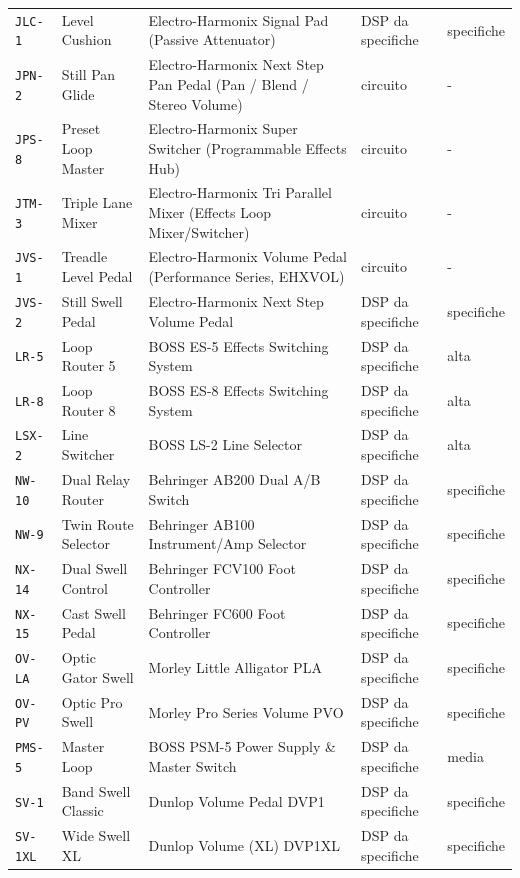\begin{xltabular}{\linewidth}{@{}l l X l l@{}}
\texttt{JLC-1} & Level Cushion & Electro-Harmonix Signal Pad (Passive Attenuator) & DSP da specifiche & specifiche\\
\texttt{JPN-2} & Still Pan Glide & Electro-Harmonix Next Step Pan Pedal (Pan / Blend / Stereo Volume) & circuito & -\\
\texttt{JPS-8} & Preset Loop Master & Electro-Harmonix Super Switcher (Programmable Effects Hub) & circuito & -\\
\texttt{JTM-3} & Triple Lane Mixer & Electro-Harmonix Tri Parallel Mixer (Effects Loop Mixer/Switcher) & circuito & -\\
\texttt{JVS-1} & Treadle Level Pedal & Electro-Harmonix Volume Pedal (Performance Series, EHXVOL) & circuito & -\\
\texttt{JVS-2} & Still Swell Pedal & Electro-Harmonix Next Step Volume Pedal & DSP da specifiche & specifiche\\
\texttt{LR-5} & Loop Router 5 & BOSS ES-5 Effects Switching System & DSP da specifiche & alta\\
\texttt{LR-8} & Loop Router 8 & BOSS ES-8 Effects Switching System & DSP da specifiche & alta\\
\texttt{LSX-2} & Line Switcher & BOSS LS-2 Line Selector & DSP da specifiche & alta\\
\texttt{NW-10} & Dual Relay Router & Behringer AB200 Dual A/B Switch & DSP da specifiche & specifiche\\
\texttt{NW-9} & Twin Route Selector & Behringer AB100 Instrument/Amp Selector & DSP da specifiche & specifiche\\
\texttt{NX-14} & Dual Swell Control & Behringer FCV100 Foot Controller & DSP da specifiche & specifiche\\
\texttt{NX-15} & Cast Swell Pedal & Behringer FC600 Foot Controller & DSP da specifiche & specifiche\\
\texttt{OV-LA} & Optic Gator Swell & Morley Little Alligator PLA & DSP da specifiche & specifiche\\
\texttt{OV-PV} & Optic Pro Swell & Morley Pro Series Volume PVO & DSP da specifiche & specifiche\\
\texttt{PMS-5} & Master Loop & BOSS PSM-5 Power Supply \& Master Switch & DSP da specifiche & media\\
\texttt{SV-1} & Band Swell Classic & Dunlop Volume Pedal DVP1 & DSP da specifiche & specifiche\\
\texttt{SV-1XL} & Wide Swell XL & Dunlop Volume (XL) DVP1XL & DSP da specifiche & specifiche\\

\end{xltabular}
